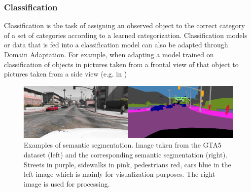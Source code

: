 \subsubsection{Classification}
Classification is the task of assigning an observed object to the correct category of a set of categories according to a learned categorization. Classification models or data that is fed into a classification model can also be adapted through Domain Adaptation. For example, when adapting a model trained on classification of objects in pictures taken from a frontal view of that object to pictures taken from a side view (e.g. in \cite{10.1007/978-3-642-15561-1_16})

\begin{figure}
	\centering
	\includegraphics[width=\textwidth]{../images/semseg.png}
	\caption{Examples of semantic segmentation. Image taken from the GTA5 dataset \cite{Richter_2016_ECCV} (left) and the corresponding semantic segmentation (right). Streets in purple, sidewalks in pink, pedestrians red, cars blue in the left image which is mainly for visualization purposes. The right image is used for processing.}
	\label{fig:semseg}
\end{figure}



